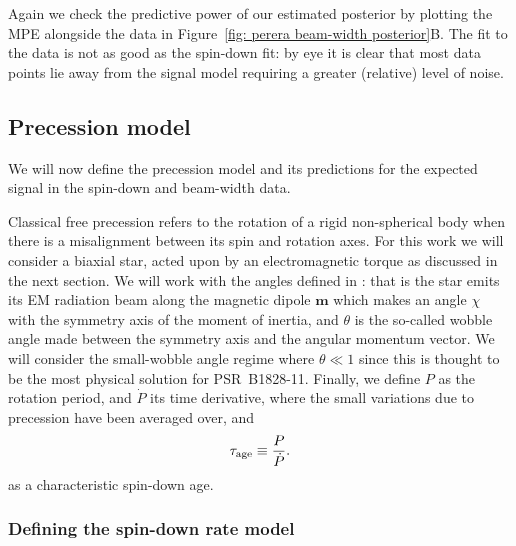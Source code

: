 \documentclass[../full_thesis/full_thesis.tex]{subfiles}
\begin{document}
Again we check the predictive power of our estimated posterior by plotting the
MPE alongside the data in Figure~\ref{fig: perera beam-width posterior}B. The fit
to the data is not as good as the spin-down fit: by eye it is clear that most
data points lie away from the signal model requiring a greater (relative) level
of noise.

\subsection{Precession model}
\label{sec: The precession model}

We will now define the precession model and its predictions for the expected
signal in the spin-down and beam-width data.

Classical free precession refers to the rotation of a rigid non-spherical body
when there is a misalignment between its spin and rotation axes. For this work
we will consider a biaxial star, acted upon by an electromagnetic torque as
discussed in the next section. We will work with the angles defined in
\citet{Jones2001}: that is the star emits its EM radiation beam along the magnetic
dipole $\mathbf{m}$ which makes an angle $\chi$ with the symmetry axis of the
moment of inertia, and $\theta$ is the so-called wobble angle made between the
symmetry axis and the angular momentum vector. We will consider the
small-wobble angle regime where $\theta \ll 1$ since this is thought to be the
most physical solution for PSR~B1828-11.  Finally, we define $P$ as the rotation
period, and $\dot P$ its time derivative, where the small variations due to
precession have been averaged over, and
\begin{align}
    \tau_{\mathrm{age}} \equiv  \frac{P}{\dot P}.
\end{align}
as a characteristic spin-down age.

\subsubsection{Defining the spin-down rate model}
\end{document}
